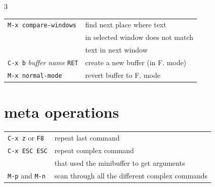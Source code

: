 \documentclass[11pt,landscape,a4paper]{article}
\begin{document}
\begin{multicols}{3}
\begin{tabular}{@{}ll@{}}
\verb|M-x compare-windows|  & find next place where text\\ 
& in selected window does not match\\
&text in next window\\
{\verb|C-x b| \emph{buffer name} \verb|RET|} & create a new buffer (in F. mode)\\ %
\verb|M-x normal-mode| & revert buffer to F. mode\\
\end{tabular}







\section{meta operations}

\begin{tabular}{@{}ll@{}}
	\verb|C-x z| or \verb|F8|  		& repeat last command\\ 
	\verb|C-x ESC ESC|  & repeat complex command\\ 
	& that used the minibuffer to get arguments\\
	\verb|M-p| and \verb|M-n| & scan through all the different complex commands\\
	

\end{tabular}
\end{multicols}
\end{document}
